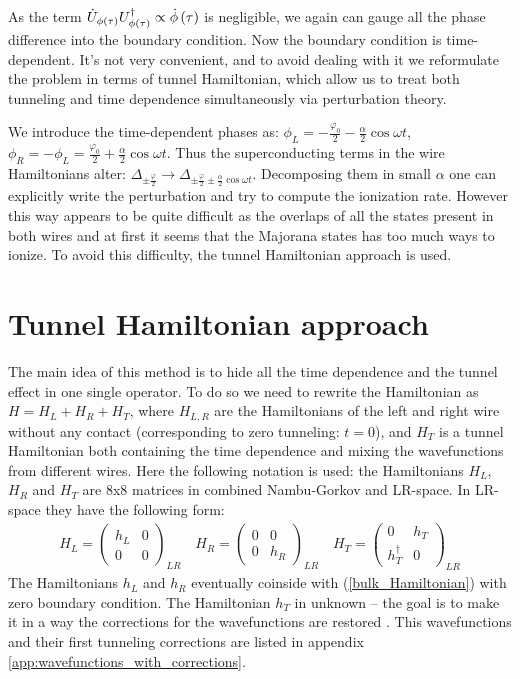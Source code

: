 As the term $ \dot{U}_{\phi\left(\tau\right)}U_{\phi\left(\tau\right)}^\dagger \propto \dot{\phi}\left(\tau\right)$ is negligible, we again can gauge all the phase difference into the boundary condition. Now the boundary condition is time-dependent. It's not very convenient, and to avoid dealing with it we reformulate the problem in terms  of tunnel Hamiltonian, which allow us to treat both tunneling and time dependence simultaneously via perturbation theory.



We introduce the time-dependent phases as: $ \phi_L=-\frac{\varphi_0}{2}-\frac{\alpha}{2}\cos \omega t $, $ \phi_R=-\phi_L=\frac{\varphi_0}{2}+\frac{\alpha}{2}\cos \omega t $. Thus the superconducting terms in the wire Hamiltonians alter: $ \Delta_{\pm\frac{\varphi}{2}} \to\Delta_{\pm\frac{\varphi}{2}\pm \frac{\alpha}{2}\cos \omega t} $. Decomposing them in small $ \alpha $ one can explicitly write the perturbation and try to compute the ionization rate. However this way appears to be quite difficult as the overlaps of all the states 
present in both wires and at first it seems that the Majorana states has too much ways to ionize. To avoid this difficulty, the tunnel Hamiltonian approach is used.

\fi

\section{Tunnel Hamiltonian approach}
\label{sec:tunnel_hamiltonian}
The main idea of this method is to hide all the time dependence and the tunnel effect in one single operator. To do so we need to rewrite the Hamiltonian as $ H=H_L+H_R+H_T $, where $ H_{L,R} $ are the Hamiltonians of the left and right wire without any contact (corresponding to zero tunneling: $ t=0 $), and $H_T  $ is a tunnel Hamiltonian both containing the time dependence and mixing the wavefunctions from different wires. 
Here the following notation is used: the Hamiltonians $ H_L $, $ H_R $ and $ H_T $ are 8x8 matrices in combined Nambu-Gorkov and LR-space. In LR-space they have the following form:
\begin{gather}
\label{tunnel_Hamiltonian_formalizm}
	H_L
	=
	\begin{pmatrix}
	h_L & 0 \\
	0 & 0
	\end{pmatrix}_{LR}
	\quad
	H_R
=
\begin{pmatrix}
0 & 0 \\
0 & h_R
\end{pmatrix}_{LR}
\quad
	H_T
=
\begin{pmatrix}
0 & h_T \\
h_T^\dagger & 0
\end{pmatrix}_{LR}	
\end{gather}
The Hamiltonians $ h_L $ and $ h_R $ eventually coinside with (\ref{bulk_Hamiltonian}) with zero boundary condition. The Hamiltonian $ h_T $ in unknown -- the goal is to make it in a way the corrections for the wavefunctions are restored . This wavefunctions and their  first tunneling corrections are listed in  appendix \ref{app:wavefunctions_with_corrections}.

